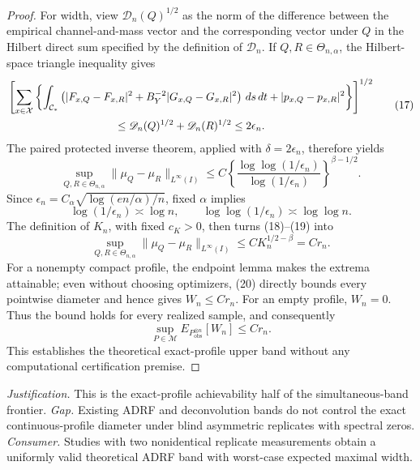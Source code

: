 \documentclass{article}
\begin{document}
\begin{proof}
For width, view \(\mathscr D_n(Q)^{1/2}\) as the norm of the difference between the empirical channel-and-mass vector and the corresponding vector under \(Q\) in the Hilbert direct sum specified by the definition of \(\mathscr D_n\).  If \(Q,R\in\Theta_{n,\alpha}\), the Hilbert-space triangle inequality gives
\[
\begin{aligned}
&\left[\sum_{x\in\mathcal X}\left\{
\int_{\mathcal C_*}\left(|F_{x,Q}-F_{x,R}|^2
+B_Y^{-2}|G_{x,Q}-G_{x,R}|^2\right)\,ds\,dt
+|p_{x,Q}-p_{x,R}|^2\right\}\right]^{1/2}\\
&\hspace{35mm}\le \mathscr D_n(Q)^{1/2}+\mathscr D_n(R)^{1/2}
\le2\epsilon_n. 
\end{aligned} \tag{17}
\]
The paired protected inverse theorem, applied with \(\delta=2\epsilon_n\), therefore yields
\[
\sup_{Q,R\in\Theta_{n,\alpha}}
\|\mu_Q-\mu_R\|_{L^\infty(I)}
\le C\left\{\frac{\log\log(1/\epsilon_n)}{\log(1/\epsilon_n)}\right\}^{\beta-1/2}. \tag{18}
\]
Since \(\epsilon_n=C_\alpha\sqrt{\log(en/\alpha)/n}\), fixed \(\alpha\) implies
\[
\log(1/\epsilon_n)\asymp\log n,
\qquad
\log\log(1/\epsilon_n)\asymp\log\log n. \tag{19}
\]
The definition of \(K_n\), with fixed \(c_K>0\), then turns (18)--(19) into
\[
\sup_{Q,R\in\Theta_{n,\alpha}}
\|\mu_Q-\mu_R\|_{L^\infty(I)}\le C K_n^{1/2-\beta}=Cr_n. \tag{20}
\]
For a nonempty compact profile, the endpoint lemma makes the extrema attainable; even without choosing optimizers, (20) directly bounds every pointwise diameter and hence gives \(W_n\le Cr_n\).  For an empty profile, \(W_n=0\).  Thus the bound holds for every realized sample, and consequently
\[
\sup_{P\in\mathcal M}E_{P_{\mathrm{obs}}^{\otimes n}}[W_n]\le Cr_n.
\]
This establishes the theoretical exact-profile upper band without any computational certification premise.
\end{proof}
\par\smallskip\noindent \textit{Justification.} This is the exact-profile achievability half of the simultaneous-band frontier. \textit{Gap.} Existing ADRF and deconvolution bands do not control the exact continuous-profile diameter under blind asymmetric replicates with spectral zeros. \textit{Consumer.} Studies with two nonidentical replicate measurements obtain a uniformly valid theoretical ADRF band with worst-case expected maximal width.
\end{document}
